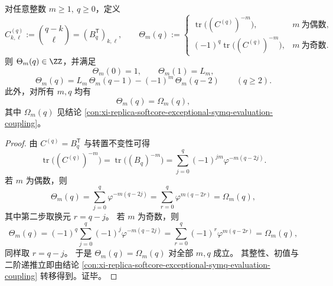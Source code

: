 \begin{theorem}\label{thm:xi-exceptional-theta-omega-identification}
对任意整数 \(m\ge 1,\ q\ge 0\)，定义
\[
C^{(q)}_{k,\ell}:=\binom{q-k}{\ell}= (B_q^{\mathsf T})_{k,\ell},
\qquad
\Theta_m(q):=
\begin{cases}
\operatorname{tr}\!\bigl((C^{(q)})^{-m}\bigr),& m\ \text{为偶数},\\[1mm]
(-1)^q\operatorname{tr}\!\bigl((C^{(q)})^{-m}\bigr),& m\ \text{为奇数}.
\end{cases}
\]
则 \(\Theta_m(q)\in\ZZ\)，并满足
\[
\Theta_m(0)=1,\qquad
\Theta_m(1)=L_m,
\]
\[
\Theta_m(q)=L_m\,\Theta_m(q-1)-(-1)^m\,\Theta_m(q-2)\qquad(q\ge 2).
\]
此外，对所有 \(m,q\) 均有
\[
\Theta_m(q)=\Omega_m(q),
\]
其中 \(\Omega_m(q)\) 见结论 \ref{con:xi-replica-softcore-exceptional-symq-evaluation-coupling}。
\end{theorem}
\begin{proof}
由 \(C^{(q)}=B_q^{\mathsf T}\) 与转置不变性可得
\[
\operatorname{tr}\!\bigl((C^{(q)})^{-m}\bigr)
=\operatorname{tr}\!\bigl((B_q)^{-m}\bigr)
=\sum_{j=0}^{q}(-1)^{jm}\varphi^{-m(q-2j)}.
\]
若 \(m\) 为偶数，则
\[
\Theta_m(q)=\sum_{j=0}^{q}\varphi^{-m(q-2j)}
=\sum_{r=0}^{q}\varphi^{m(q-2r)}
=\Omega_m(q),
\]
其中第二步取换元 \(r=q-j\)。
若 \(m\) 为奇数，则
\[
\Theta_m(q)
=(-1)^q\sum_{j=0}^{q}(-1)^j\varphi^{-m(q-2j)}
=\sum_{r=0}^{q}(-1)^r\varphi^{m(q-2r)}
=\Omega_m(q),
\]
同样取 \(r=q-j\)。
于是 \(\Theta_m(q)=\Omega_m(q)\) 对全部 \(m,q\) 成立。
其整性、初值与二阶递推立即由结论 \ref{con:xi-replica-softcore-exceptional-symq-evaluation-coupling} 转移得到。证毕。
\end{proof}

